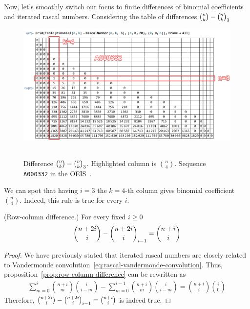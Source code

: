 Now, let's smoothly switch our focus to finite differences of binomial coefficients and iterated rascal numbers.
Considering the table of differences $\binom{n}{k}-\binom{n}{k}_{3}$
\begin{figure}[H]
    \centering
    \includegraphics[width=1\textwidth]{img/01_Difference_Binomial_Rascal_i_3_BinomialCoefficients}
    ~\caption{Difference $\binom{n}{k}-\binom{n}{k}_{3}$.
    Highlighted column is $\binom{n}{4}$.
    Sequence \href{https://oeis.org/A000332}{\texttt{A000332}} in the OEIS~\cite{sloane2009binomial}.}
    \label{fig:difference-binomial-rascal-i-3}
\end{figure}
We can spot that having $i=3$ the $k=4$-th column gives binomial coefficient $\binom{n}{4}$.
Indeed, this rule is true for every $i$.
\begin{proposition}
    \label{prop:row-column-difference}
    (Row-column difference.) For every fixed $i\geq0$
    \begin{align*}
        \binom{n+2i}{i} - \binom{n+2i}{i}_{i-1} = \binom{n+i}{i}
    \end{align*}
    \begin{proof}
        We have previously stated that iterated rascal numbers are
        closely related to Vandermonde convolution~\eqref{eq:rascal-vandermonde-convolution}.
        Thus, proposition~\eqref{prop:row-column-difference} can be rewritten as
        \begin{align*}
            \sum_{m=0}^{i} \binom{n+i}{m} \binom{i}{i-m} - \sum_{m=0}^{i-1} \binom{n+i}{m} \binom{i}{i-m} = \binom{n+i}{i} \binom{i}{0}
        \end{align*}
        Therefore, $\binom{n+2i}{i} - \binom{n+2i}{i}_{i-1} = \binom{n+i}{i}$ is indeed true.
    \end{proof}
\end{proposition}
